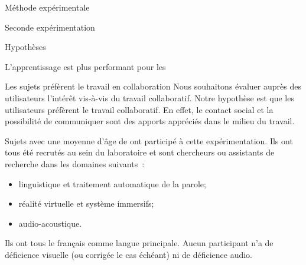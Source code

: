 \documentclass[myfrancais]{mythesis}
\begin{document}
\begin{mychapter}{Méthode expérimentale}
\begin{mysection}{Seconde expérimentation}
\begin{mysubsection}{Hypothèses}
\begin{myparagraph}{ L'apprentissage est plus performant pour les }
				\end{myparagraph}
				\begin{myparagraph}{ Les sujets préfèrent le travail en collaboration}
					Nous souhaitons évaluer auprès des utilisateurs l'intérêt vis-à-vis du travail collaboratif.
					Notre hypothèse est que les utilisateurs préfèrent le travail collaboratif.
					En effet, le contact social et la possibilité de communiquer sont des apports appréciés dans le milieu du travail.
				\end{myparagraph}
			\end{mysubsection}
			\begin{mysubsection}{Sujets}
				 avec une moyenne d'âge de  ont participé à cette expérimentation.
				Ils ont tous été recrutés au sein du laboratoire  et sont chercheurs ou assistants de recherche dans les domaines suivants~:
				\begin{itemize}
					\item linguistique et traitement automatique de la parole;
					\item réalité virtuelle et système immersifs;
					\item audio-acoustique.
				\end{itemize}
				Ils ont tous le français comme langue principale.
				Aucun participant n'a de déficience visuelle (ou corrigée le cas échéant) ni de déficience audio.


\end{mysubsection}
\end{mysection}
\end{mychapter}
\end{document}
